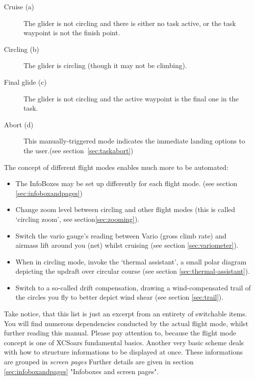 \begin{description}
\item[Cruise (a)]   The glider is not circling and there is either no 
task active, or the task waypoint is not the finish point.
\item[Circling (b)]  The glider is circling (though it may not be climbing).
\item[Final glide (c)]  The glider is not circling and the active waypoint 
is the final one in the task.
\item[Abort (d)]  This manually-triggered mode indicates the immediate 
landing options to the user.(see section~\ref{sec:taskabort})
\end{description}

The concept of different flight modes enables much more to be automated:
\begin{itemize}
\item {} The InfoBoxes may be set up differently for 
each flight mode. (see section \ref{sec:infoboxandpages})
\item {} Change zoom level between circling and other 
flight modes (this is called `circling zoom', see section\ref{sec:zooming}).
\item {} Switch the vario gauge's reading between Vario 
(gross climb rate) and airmass lift around you (net) whilst cruising 
(see section \ref{sec:variometer}).
\item {} When in circling mode, invoke the 
`thermal assistant', a small polar diagram depicting the updraft over 
circular course (see section \ref{sec:thermal-assistant}).
\item {} Switch to a so-called drift compensation, 
drawing a wind-compensated trail of the circles you fly to better depict 
wind shear (see section \ref{sec:trail}). 
\end{itemize}

Take notice, that this list is just an excerpt from an entirety of 
switchable items. You will find numerous dependencies conducted by the 
actual flight mode, whilst further reading this manual. Please pay 
attention to, because the flight mode concept is one of XCSoars 
fundamental basics. Another very basic scheme deals with how to structure 
informations to be displayed at once. These informations are grouped in 
\emph{screen pages} Further details are given in section 
\ref{sec:infoboxandpages} "Infoboxes and screen pages".



